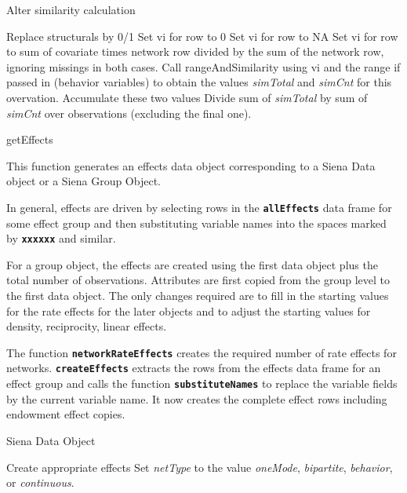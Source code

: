 \documentclass[12pt,a4paper]{article}
\makeatletter
\renewcommand{\=}{\,=\,}
\newcommand{\+}{\,+\,}
\newcommand{\nnm}[1]{\textsf{\textit{#1}}}
\renewcommand{\section}{\@startsection{section}{1}
                {0pt}{\baselineskip}{0.5\baselineskip}
                {\centering\sffamily} }
\renewcommand{\subsection}{\@startsection{subsection}{2}
                {0pt}{0.7\baselineskip}{0.3\baselineskip}
                {\sffamily} }
\renewcommand{\subsubsection}{\@startsection{subsubsection}{3}
                {0pt}{0.5\baselineskip}{0.3\baselineskip}
                {\it\sffamily} }
\newcommand{\sfn}[1]{\textbf{\texttt{#1}}}
\makeatother
\begin{document}
\subsubsection{Alter similarity calculation}
\label{sec:simdist2}
\begin{algorithmic}
\STATE Replace structurals by 0/1
\STATE Set vi for row to 0
\STATE Set vi for row to NA
\ELSE
\STATE Set vi for row to sum of covariate times network row divided by the sum
of the network row, ignoring missings in both cases.
\ENDIF
\ENDFOR
\STATE Call rangeAndSimilarity using vi and the range if passed in (behavior
variables) to obtain the values \nnm{simTotal} and \nnm{simCnt} for this
overvation.
\STATE Accumulate these two values
\ENDFOR
Divide sum of \nnm{simTotal} by sum of \nnm{simCnt} over observations (excluding
the final one).
\end{algorithmic}
\section{getEffects}

This function generates an effects data object corresponding to a Siena Data
object or a Siena Group Object.

In general, effects are driven by selecting rows in the \sfn{allEffects} data
frame for some effect group and then substituting variable names into the spaces
marked by \sfn{xxxxxx} and similar.

For a group object, the effects are created using the first data object plus the
total number of observations. Attributes are first copied from the group level
to the first data object. The only changes required are to fill in the starting
values for the rate effects for the later objects and to adjust the starting
values for density, reciprocity, linear effects.

The function \sfn{networkRateEffects} creates the required number of rate
effects for networks.  \sfn{createEffects} extracts the rows from the effects
data frame for an effect group and calls the function \sfn{substituteNames} to
replace the variable fields by the current variable name. It now creates the
complete effect rows including endowment effect copies.

\subsection{Siena Data Object}
\begin{algorithmic}
\STATE Create appropriate effects
\STATE Set \nnm{netType} to the value \nnm{oneMode},
      \nnm{bipartite},  \nnm{behavior}, or \nnm{continuous}.
\ENDFOR
\end{algorithmic}
\end{document}
